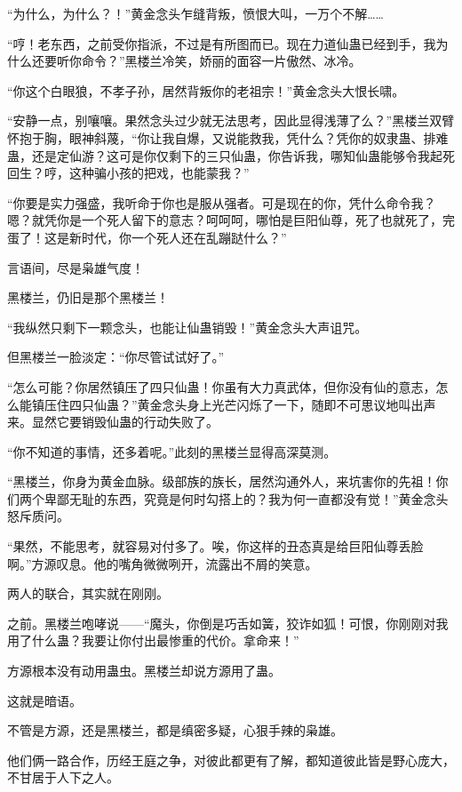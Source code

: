 
\begin{this_body}

“为什么，为什么？！”黄金念头乍缝背叛，愤恨大叫，一万个不解……

“哼！老东西，之前受你指派，不过是有所图而已。现在力道仙蛊已经到手，我为什么还要听你命令？”黑楼兰冷笑，娇丽的面容一片傲然、冰冷。

“你这个白眼狼，不孝子孙，居然背叛你的老祖宗！”黄金念头大恨长啸。

“安静一点，别嚷嚷。果然念头过少就无法思考，因此显得浅薄了么？”黑楼兰双臂怀抱于胸，眼神斜蔑，“你让我自爆，又说能救我，凭什么？凭你的奴隶蛊、排难蛊，还是定仙游？这可是你仅剩下的三只仙蛊，你告诉我，哪知仙蛊能够令我起死回生？哼，这种骗小孩的把戏，也能蒙我？”

“你要是实力强盛，我听命于你也是服从强者。可是现在的你，凭什么命令我？嗯？就凭你是一个死人留下的意志？呵呵呵，哪怕是巨阳仙尊，死了也就死了，完蛋了！这是新时代，你一个死人还在乱蹦跶什么？”

言语间，尽是枭雄气度！

黑楼兰，仍旧是那个黑楼兰！

“我纵然只剩下一颗念头，也能让仙蛊销毁！”黄金念头大声诅咒。

但黑楼兰一脸淡定：“你尽管试试好了。”

“怎么可能？你居然镇压了四只仙蛊！你虽有大力真武体，但你没有仙的意志，怎么能镇压住四只仙蛊？”黄金念头身上光芒闪烁了一下，随即不可思议地叫出声来。显然它要销毁仙蛊的行动失败了。

“你不知道的事情，还多着呢。”此刻的黑楼兰显得高深莫测。

“黑楼兰，你身为黄金血脉。级部族的族长，居然沟通外人，来坑害你的先祖！你们两个卑鄙无耻的东西，究竟是何时勾搭上的？我为何一直都没有觉！”黄金念头怒斥质问。

“果然，不能思考，就容易对付多了。唉，你这样的丑态真是给巨阳仙尊丢脸啊。”方源叹息。他的嘴角微微咧开，流露出不屑的笑意。

两人的联合，其实就在刚刚。

之前。黑楼兰咆哮说——“魔头，你倒是巧舌如簧，狡诈如狐！可恨，你刚刚对我用了什么蛊？我要让你付出最惨重的代价。拿命来！”

方源根本没有动用蛊虫。黑楼兰却说方源用了蛊。

这就是暗语。

不管是方源，还是黑楼兰，都是缜密多疑，心狠手辣的枭雄。

他们俩一路合作，历经王庭之争，对彼此都更有了解，都知道彼此皆是野心庞大，不甘居于人下之人。


\end{this_body}
